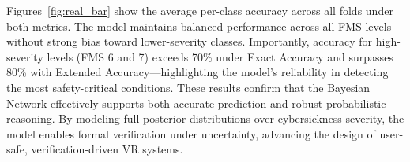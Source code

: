 \documentclass{vgtc}                          %
\begin{document}
Figures~\ref{fig:real_bar} 
show the average per-class accuracy across all folds under both metrics. The model maintains balanced performance across all FMS levels without strong bias toward lower-severity classes. Importantly, accuracy for high-severity levels (FMS 6 and 7) exceeds 70\% under Exact Accuracy and surpasses 80\% with Extended Accuracy—highlighting the model's reliability in detecting the most safety-critical conditions. %
These results confirm that the Bayesian Network effectively supports both accurate prediction and robust probabilistic reasoning. By modeling full posterior distributions over cybersickness severity, the model enables formal verification under uncertainty, advancing the design of user-safe, verification-driven VR systems.





\end{document}
